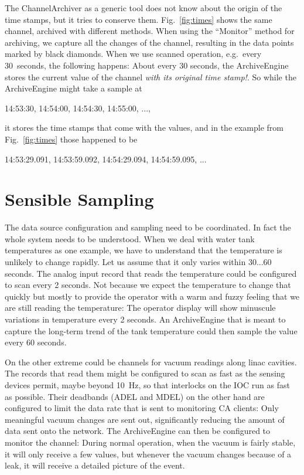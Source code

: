 The ChannelArchiver as a generic tool does not know about the origin
of the time stamps, but it tries to conserve them.
Fig.~\ref{fig:times} shows the same channel, archived with different methods.
When using the ``Monitor'' method for archiving, we capture all the
changes of the channel, resulting in the data points marked by black
diamonds.
When we use scanned operation, e.g.\ every 30~seconds, the following
happens: About every 30 seconds, the ArchiveEngine stores the current
value of the channel \emph{with its original time stamp!}.
So while the ArchiveEngine might take a sample at
\begin{center}
14:53:30, 14:54:00, 14:54:30, 14:55:00, ...,
\end{center}
it stores the time stamps that come with the values, and in the
example from Fig.~\ref{fig:times} those happened to be
\begin{center}
14:53:29.091,  14:53:59.092, 14:54:29.094,  14:54:59.095, ...
\end{center}

\section{Sensible Sampling}
The data source configuration and sampling need to be coordinated.  In
fact the whole system needs to be understood. When we deal with water
tank temperatures as one example, we have to understand that the
temperature is unlikely to change rapidly. Let us assume that it only
varies within 30...60 seconds. The analog input record that reads the
temperature could be configured to scan every 2 seconds. Not because
we expect the temperature to change that quickly but mostly to provide
the operator with a warm and fuzzy feeling that we are still reading
the temperature: The operator display will show minuscule variations
in temperature every 2 seconds.  An ArchiveEngine that is meant to
capture the long-term trend of the tank temperature could then sample
the value every 60 seconds.

On the other extreme could be channels for vacuum readings along linac
cavities. The records that read them might be configured to scan as
fast as the sensing devices permit, maybe beyond 10~Hz, so that
interlocks on the IOC run as fast as possible. Their deadbands (ADEL
and MDEL) on the other hand are configured to limit the data rate that
is sent to monitoring CA clients: Only meaningful vacuum changes are
sent out, significantly reducing the amount of data sent onto the
network.  The ArchiveEngine can then be configured to monitor the
channel: During normal operation, when the vacuum is fairly stable, it
will only receive a few values, but whenever the vacuum changes
because of a leak, it will receive a detailed picture of the event.

